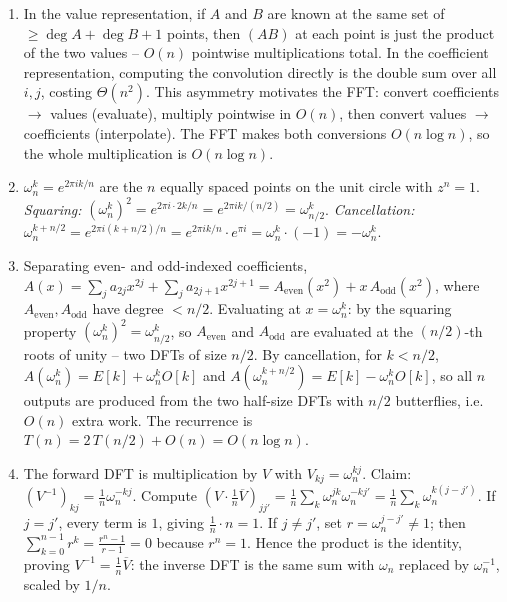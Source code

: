 \documentclass[11pt]{article}
\begin{document}
\begin{enumerate}[label=\textbf{A\arabic*.}, leftmargin=2.2em]
\item In the value representation, if $A$ and $B$ are known at the same set of $\ge \deg A +
\deg B + 1$ points, then $(AB)$ at each point is just the product of the two values --
$O(n)$ pointwise multiplications total. In the coefficient representation, computing the
convolution directly is the double sum over all $i, j$, costing $\Theta(n^2)$. This asymmetry
motivates the FFT: convert coefficients $\to$ values (evaluate), multiply pointwise in $O(n)$,
then convert values $\to$ coefficients (interpolate). The FFT makes both conversions
$O(n \log n)$, so the whole multiplication is $O(n \log n)$.

\item $\omega_n^k = e^{2\pi i k/n}$ are the $n$ equally spaced points on the unit circle with
$z^n = 1$. \emph{Squaring:} $(\omega_n^k)^2 = e^{2\pi i \cdot 2k/n} = e^{2\pi i k/(n/2)} =
\omega_{n/2}^k$. \emph{Cancellation:} $\omega_n^{k + n/2} = e^{2\pi i (k+n/2)/n} = e^{2\pi i
k/n} \cdot e^{\pi i} = \omega_n^k \cdot (-1) = -\omega_n^k$.

\item Separating even- and odd-indexed coefficients, $A(x) = \sum_j a_{2j} x^{2j} + \sum_j
a_{2j+1} x^{2j+1} = A_{\text{even}}(x^2) + x\, A_{\text{odd}}(x^2)$, where $A_{\text{even}},
A_{\text{odd}}$ have degree $< n/2$. Evaluating at $x = \omega_n^k$: by the squaring property
$(\omega_n^k)^2 = \omega_{n/2}^k$, so $A_{\text{even}}$ and $A_{\text{odd}}$ are evaluated at
the $(n/2)$-th roots of unity -- two DFTs of size $n/2$. By cancellation, for $k < n/2$,
$A(\omega_n^k) = E[k] + \omega_n^k O[k]$ and $A(\omega_n^{k+n/2}) = E[k] - \omega_n^k O[k]$,
so all $n$ outputs are produced from the two half-size DFTs with $n/2$ butterflies, i.e.\
$O(n)$ extra work. The recurrence is $T(n) = 2\,T(n/2) + O(n) = O(n\log n)$.

\item The forward DFT is multiplication by $V$ with $V_{kj} = \omega_n^{kj}$. Claim:
$(V^{-1})_{kj} = \frac1n \omega_n^{-kj}$. Compute $(V \cdot \frac1n \overline V)_{j j'} =
\frac1n \sum_{k} \omega_n^{jk} \omega_n^{-k j'} = \frac1n \sum_k \omega_n^{k(j-j')}$. If $j =
j'$, every term is $1$, giving $\frac1n \cdot n = 1$. If $j \ne j'$, set $r = \omega_n^{j-j'}
\ne 1$; then $\sum_{k=0}^{n-1} r^k = \frac{r^n - 1}{r - 1} = 0$ because $r^n = 1$. Hence the
product is the identity, proving $V^{-1} = \frac1n \overline V$: the inverse DFT is the same
sum with $\omega_n$ replaced by $\omega_n^{-1}$, scaled by $1/n$.


\end{enumerate}
\end{document}
